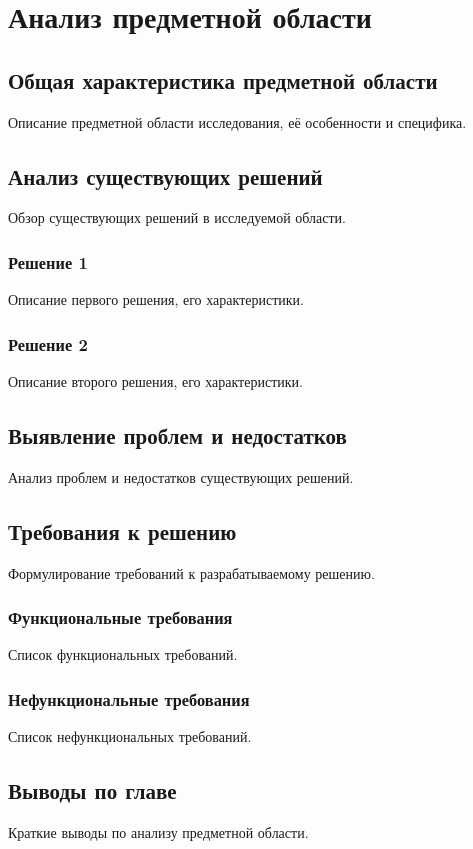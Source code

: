 \chapter{Анализ предметной области}

\section{Общая характеристика предметной области}

Описание предметной области исследования, её особенности и специфика.

\section{Анализ существующих решений}

Обзор существующих решений в исследуемой области.

\subsection{Решение 1}

Описание первого решения, его характеристики.

\subsection{Решение 2}

Описание второго решения, его характеристики.

\section{Выявление проблем и недостатков}

Анализ проблем и недостатков существующих решений.

\section{Требования к решению}

Формулирование требований к разрабатываемому решению.

\subsection{Функциональные требования}

Список функциональных требований.

\subsection{Нефункциональные требования}

Список нефункциональных требований.

\section{Выводы по главе}

Краткие выводы по анализу предметной области.
